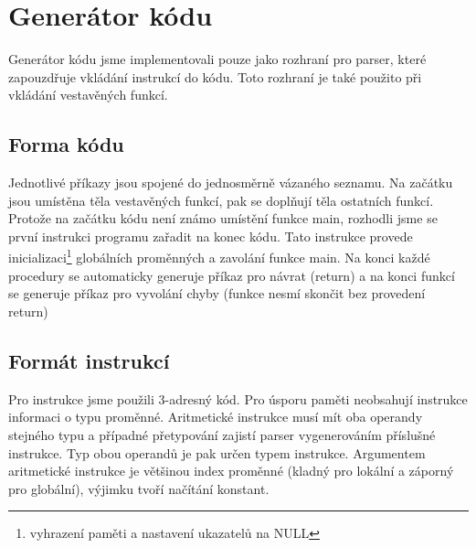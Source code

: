 \section{Generátor kódu}

Generátor kódu jsme implementovali pouze jako rozhraní pro parser, které zapouzdřuje vkládání instrukcí do kódu. Toto rozhraní je také použito při vkládání vestavěných funkcí.
\subsection{Forma kódu}

Jednotlivé příkazy jsou spojené do jednosměrně vázaného seznamu. Na začátku jsou umístěna těla vestavěných funkcí, pak se doplňují těla ostatních funkcí. Protože na začátku kódu není známo umístění funkce main, rozhodli jsme se první instrukci programu zařadit na konec kódu. Tato instrukce provede inicializaci\footnote{vyhrazení paměti a nastavení ukazatelů na NULL} globálních proměnných a zavolání funkce main.
Na konci každé procedury se automaticky generuje příkaz pro návrat (return) a na konci funkcí se generuje příkaz pro vyvolání chyby (funkce nesmí skončit bez provedení return)

\subsection{Formát instrukcí}

Pro instrukce jsme použili 3-adresný kód. Pro úsporu paměti neobsahují instrukce informaci o typu proměnné. Aritmetické instrukce musí mít oba operandy stejného typu a případné přetypování zajistí parser vygenerováním příslušné instrukce. Typ obou operandů je pak určen typem instrukce. Argumentem aritmetické instrukce je většinou index proměnné (kladný pro lokální a záporný pro globální), výjimku tvoří načítání konstant.

